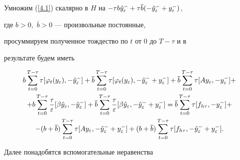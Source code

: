 \begin{pf}


Умножим (\ref{4.1}) скалярно в $H$ на $-\tau b \Hat{y}_\varepsilon^{-}


+ \tau \overline{b}(-\Hat{y}_\varepsilon^{-} + y_\varepsilon^{-} )$,


где $b > 0,$ $\overline{b} > 0$ --- произвольные постоянные,


просуммируем полученное тождество по $t$ от $0$ до $T-\tau$ и в


результате будем иметь


\begin{gather}


 b\sum^{T-\tau}_{t=0}\tau [ \varphi_{t}(y_\varepsilon),


  -\Hat{y}_\varepsilon^{-}]+


 \overline{b}\sum^{T-\tau}_{t=0}\tau [ \varphi _{t}(y_\varepsilon),


 -\Hat{y}_\varepsilon^{-} + y_\varepsilon^{-} ] +


\overline{b}\sum^{T-\tau}_{t=0}\tau [ Ay_\varepsilon,


-y_\varepsilon^{-} ] +\notag\\


%


+ b\sum^{T-\tau}_{t=0}\frac{\tau}{\varepsilon}


[ \beta\Hat{y}_\varepsilon,-\Hat{y}_\varepsilon^{-} ] +


\overline{b}\sum^{T-\tau}_{t=0}\frac{\tau}{\varepsilon}


[ \beta\Hat{y}_\varepsilon,-\Hat{y}_\varepsilon^{-} + y_\varepsilon^{-} ] =


\overline{b}\sum^{T-\tau}_{t=0}\tau [ f_{h\tau}, -y_\varepsilon^{-} ]+


\notag\\


%


-(b+\overline{b})\sum^{T-\tau}_{t=0}\tau


[ Ay_\varepsilon ,-\Hat{y}_\varepsilon^{-}+ y_\varepsilon^{-} ] +


(b+\overline{b})\sum^{T-\tau}_{t=0}\tau


[ f_{h\tau},-\Hat{y}_\varepsilon^{-} + y_\varepsilon^{-} ].


\label{5.05}


\end{gather}


Далее понадобятся вспомогательные неравенства


\begin{equation}



\end{equation}
\end{pf}
